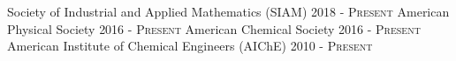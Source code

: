 
\begin{cventries}
  \cventry
    {} %
    {Society of Industrial and Applied Mathematics (SIAM)} %
    {} %
    {2018 - \textsc{Present}} %
    {}
  \cventry
    {} %
    {American Physical Society} %
    {} %
    {2016 - \textsc{Present}} %
    {}
  \cventry
    {} %
    {American Chemical Society} %
    {} %
    {2016 - \textsc{Present}} %
    {}
  \cventry
    {} %
    {American Institute of Chemical Engineers (AIC\textnormal{h}E)} %
    {} %
    {2010 - \textsc{Present}} %
    {}
\end{cventries}
